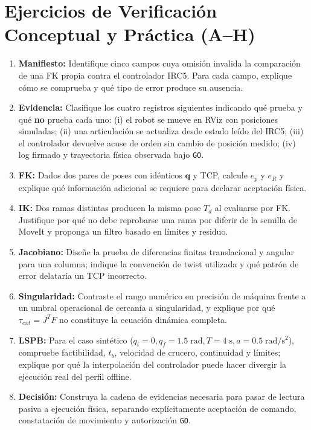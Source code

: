 \documentclass[10.5pt, a4paper]{article}
\begin{document}
\section{Ejercicios de Verificación Conceptual y Práctica (A–H)}
\begin{enumerate}[label=\textbf{Ejercicio \Alph* —}, leftmargin=*, itemsep=3pt]
    \item \textbf{Manifiesto:} Identifique cinco campos cuya omisión invalida la comparación de una FK propia contra el controlador IRC5. Para cada campo, explique cómo se comprueba y qué tipo de error produce su ausencia.
    \item \textbf{Evidencia:} Clasifique los cuatro registros siguientes indicando qué prueba y qué \textbf{no} prueba cada uno: (i) el robot se mueve en RViz con posiciones simuladas; (ii) una articulación se actualiza desde estado leído del IRC5; (iii) el controlador devuelve acuse de orden sin cambio de posición medido; (iv) log firmado y trayectoria física observada bajo \texttt{GO}.
    \item \textbf{FK:} Dados dos pares de poses con idénticos $\mathbf{q}$ y TCP, calcule $e_p$ y $e_R$ y explique qué información adicional se requiere para declarar aceptación física.
    \item \textbf{IK:} Dos ramas distintas producen la misma pose $T_d$ al evaluarse por FK. Justifique por qué no debe reprobarse una rama por diferir de la semilla de MoveIt y proponga un filtro basado en límites y residuo.
    \item \textbf{Jacobiano:} Diseñe la prueba de diferencias finitas translacional y angular para una columna; indique la convención de twist utilizada y qué patrón de error delataría un TCP incorrecto.
    \item \textbf{Singularidad:} Contraste el rango numérico en precisión de máquina frente a un umbral operacional de cercanía a singularidad, y explique por qué $\tau_{ext} = J^T F$ no constituye la ecuación dinámica completa.
    \item \textbf{LSPB:} Para el caso sintético ($q_i=0, q_f=1.5\;\mathrm{rad}, T=4\;\mathrm{s}, a=0.5\;\mathrm{rad/s^2}$), compruebe factibilidad, $t_b$, velocidad de crucero, continuidad y límites; explique por qué la interpolación del controlador puede hacer divergir la ejecución real del perfil offline.
    \item \textbf{Decisión:} Construya la cadena de evidencias necesaria para pasar de lectura pasiva a ejecución física, separando explícitamente aceptación de comando, constatación de movimiento y autorización \texttt{GO}.
\end{enumerate}
\end{document}
